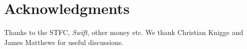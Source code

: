 \documentclass[useAMS,usenatbib]{sam}
\begin{document}
\section*{Acknowledgments}

Thanks to the STFC, {\it Swift}, other money etc. We thank Christian Knigge and James Matthews for useful discussions.

\end{document}
